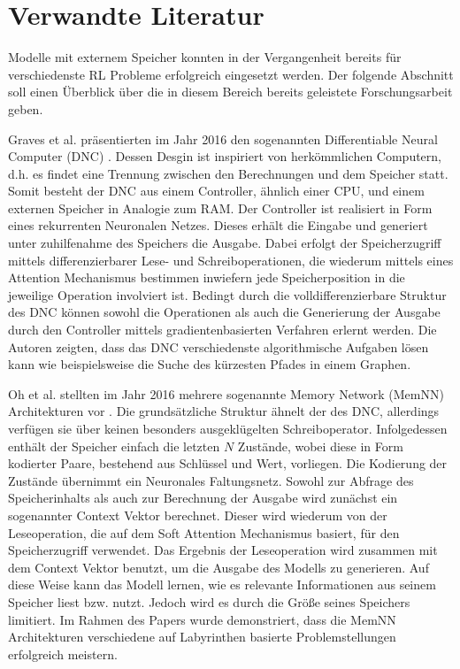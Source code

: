 \chapter{Verwandte Literatur}

Modelle mit externem Speicher konnten in der Vergangenheit bereits für verschiedenste \ac{RL} Probleme erfolgreich eingesetzt werden. Der folgende Abschnitt soll einen Überblick über die in diesem Bereich bereits geleistete Forschungsarbeit geben.

Graves et al. präsentierten im Jahr 2016 den sogenannten Differentiable Neural Computer (DNC) \cite{DNC}. Dessen Desgin ist inspiriert von herkömmlichen Computern, d.h. es findet eine Trennung zwischen den Berechnungen und dem Speicher statt. Somit besteht der DNC aus einem Controller, ähnlich einer CPU, und einem externen Speicher in Analogie zum RAM. Der Controller ist realisiert in Form eines rekurrenten Neuronalen Netzes. Dieses erhält die Eingabe und generiert unter zuhilfenahme des Speichers die Ausgabe. Dabei erfolgt der Speicherzugriff mittels differenzierbarer Lese- und Schreiboperationen, die wiederum mittels eines Attention Mechanismus bestimmen inwiefern jede Speicherposition in die jeweilige Operation involviert ist. Bedingt durch die volldifferenzierbare Struktur des DNC können sowohl die Operationen als auch die Generierung der Ausgabe durch den Controller mittels gradientenbasierten Verfahren erlernt werden. Die Autoren zeigten, dass das DNC verschiedenste algorithmische Aufgaben lösen kann wie beispielsweise die Suche des kürzesten Pfades in einem Graphen.

Oh et al. stellten im Jahr 2016 mehrere sogenannte Memory Network (MemNN) Architekturen vor \cite{MemNN}. Die grundsätzliche Struktur ähnelt der des DNC, allerdings verfügen sie über keinen besonders ausgeklügelten Schreiboperator. Infolgedessen enthält der Speicher einfach die letzten $N$ Zustände, wobei diese in Form kodierter Paare, bestehend aus Schlüssel und Wert, vorliegen. Die Kodierung der Zustände übernimmt ein Neuronales Faltungsnetz. Sowohl zur Abfrage des Speicherinhalts als auch zur Berechnung der Ausgabe wird zunächst ein sogenannter Context Vektor berechnet. Dieser wird wiederum von der Leseoperation, die auf dem Soft Attention Mechanismus basiert, für den Speicherzugriff verwendet. Das Ergebnis der Leseoperation wird zusammen mit dem Context Vektor benutzt, um die Ausgabe des Modells zu generieren. Auf diese Weise kann das Modell lernen, wie es relevante Informationen aus seinem Speicher liest bzw. nutzt. Jedoch wird es durch die Größe seines Speichers limitiert. Im Rahmen des Papers wurde demonstriert, dass die MemNN Architekturen verschiedene auf Labyrinthen basierte Problemstellungen erfolgreich meistern.

